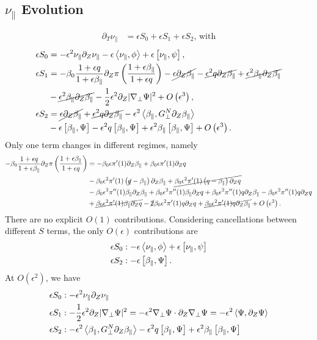 \documentclass{article}
\newcommand{\para}{\parallel}
\newcommand{\ep}{\epsilon}
\newcommand{\np}{\nabla_\perp}
\newcommand{\p}{\partial}
\newcommand{\fr}{\frac{1+\ep q}{1+\ep\beta_\para}}
\newcommand{\frinv}{\frac{1+\ep\beta_\para}{1+\ep q}}
\newcommand{\GN}{G_\perp^N}
\newcommand{\pth} [1] {\left( #1 \right) }
\newcommand{\br} [1] {\left[ #1 \right] }
\begin{document}
\subsection{$\nu_\para$ Evolution}
\begin{align} 
    \p_T\nu_\para &= \ep S_0 + \ep S_1 + \ep S_2 \text{, with}
\end{align}
\begin{align*}
    \ep S_0 &= -\ep^2\nu_\para \p_Z\nu_\para - \ep\Braket{\nu_\para, \phi} + \ep\br{\nu_\para, \psi}, \\ 
    \ep  S_1 &= -\beta_0\fr\p_Z\pi\pth{\frinv} - \cancel{\ep\p_Z\beta_\para} - \cancel{\ep^2q\p_Z\beta_\para} + \cancel{\ep^2\beta_\para\p_Z\beta_\para} \\ 
        &- \cancel{\ep^2\beta_\para\p_Z\beta_\para} - \frac{1}{2}\ep^2\p_Z |\np\Psi|^2 + O\pth{\ep^3}, \\ 
    \ep S_2 &= \cancel{\ep\p_Z\beta_\para} + \cancel{\ep^2 q\p_Z\beta_\para} - \ep^2\Braket{\beta_\para, \GN\p_Z\beta_\para} \\ 
        &- \ep\br{\beta_\para, \Psi} - \ep^2q\br{\beta_\para, \Psi} + \ep^2\beta_\para \br{\beta_\para, \Psi} + O\pth{\ep^3}. 
\end{align*}
Only one term changes in different regimes, namely 
\begin{align*}
    -\beta_0\fr\p_Z\pi\pth{\frinv} &= - \beta_0\ep\pi'(1) \p_Z\beta_\para + \beta_0\ep\pi'(1) \p_Zq \\ 
        &- \beta_0\ep^2\pi'(1) \pth{\cancel{q}-\beta_\para} \p_Z\beta_\para + \cancel{\beta_0\ep^2\pi'(1) \pth{q-\beta_\para} \p_Zq} \\ 
        &- \beta_0\ep^2\pi''(1) \beta_\para\p_Z \beta_\para + \beta_0\ep^2\pi''(1) \beta_\para\p_Zq + \beta_0\ep^2\pi''(1) q\p_Z\beta_\para - \beta_0\ep^2\pi''(1) q\p_Z q \\ 
        &+ \cancel{\beta_0\ep^2\pi'(1) \beta_\para\p_Zq} - \cancel{2}\beta_0\ep^2\pi'(1) q\p_Z q + \cancel{\beta_0\ep^2\pi'(1) q\p_Z\beta_\para} + O\pth{\ep^3}. 
\end{align*}
There are no explicit $O(1)$ contributions. Considering cancellations between different $S$ terms, the only $O(\ep)$ contributions are
\begin{align*}
    \ep S_0 &: - \ep\Braket{\nu_\para, \phi} + \ep\br{\nu_\para, \psi} \\ 
    \ep S_2 &: - \ep\br{\beta_\para, \Psi}. 
\end{align*}
At $O\pth{\ep^2}$, we have 
\begin{align*}
    \ep S_0 &: -\ep^2\nu_\para \p_Z\nu_\para \\ 
    \ep S_1 &: - \frac{1}{2}\ep^2\p_Z |\np\Psi|^2 = -\ep^2\np\Psi \cdot \p_Z\np\Psi = -\ep^2 \Braket{\Psi, \p_Z\Psi} \\ 
    \ep S_2 &: - \ep^2\Braket{\beta_\para, \GN\p_Z\beta_\para} - \ep^2q\br{\beta_\para, \Psi} + \ep^2\beta_\para \br{\beta_\para, \Psi}
\end{align*}
\end{document}
